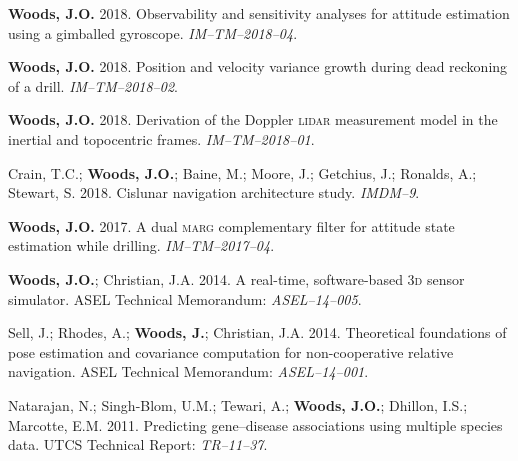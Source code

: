 \documentclass[12pt,letterpaper]{article}
\begin{document}
\medskip
\par\textbf{Woods, J.O.} 2018. Observability and sensitivity analyses for attitude estimation using a gimballed gyroscope. \textit{IM--TM--2018--04}.

\medskip
\par \textbf{Woods, J.O.} 2018. Position and velocity variance growth during dead reckoning of a drill. \textit{IM--TM--2018--02}.

\medskip
\par \textbf{Woods, J.O.} 2018. Derivation of the Doppler \textsc{lidar} measurement model in the inertial and topocentric frames. \textit{IM--TM--2018--01}.

\medskip
\par Crain, T.C.; \textbf{Woods, J.O.}; Baine, M.; Moore, J.; Getchius, J.; Ronalds, A.; Stewart, S. 2018. Cislunar navigation architecture study. \textit{IMDM--9}.

\medskip
\par \textbf{Woods, J.O.} 2017. A dual \textsc{marg} complementary filter for attitude state estimation while drilling. \textit{IM--TM--2017--04}.

\medskip
\par \textbf{Woods, J.O.}; Christian, J.A. 2014. A real-time, software-based \textsc{3d} sensor simulator. ASEL Technical Memorandum: \textit{ASEL--14--005}.

\medskip
\par Sell, J.; Rhodes, A.; \textbf{Woods, J.}; Christian, J.A. 2014. Theoretical foundations of pose estimation and covariance computation for non-cooperative relative navigation. ASEL Technical Memorandum: \textit{ASEL--14--001}.

\medskip
\par Natarajan, N.; Singh-Blom, U.M.; Tewari, A.; \textbf{Woods, J.O.}; Dhillon, I.S.; Marcotte, E.M. 2011. Predicting gene--disease associations using multiple species data. UTCS Technical Report: \textit{TR--11--37}.
\end{document}
